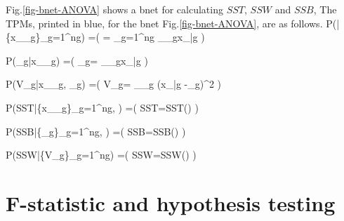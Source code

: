 Fig.\ref{fig-bnet-ANOVA}
shows a bnet for
calculating $SST$,
$SSW$ and $SSB$,
The TPMs, 
printed in blue,
for the bnet 
Fig.\ref{fig-bnet-ANOVA},
are as follows.
\beq\color{blue}
P(|\{x_{\Sigma_g}\}_{g=1}^{ng}) =\indi\left(
=
\sum_{g=1}^{ng}
\sum_{\s\in\Sigma_g}x_{\s|g}
\right)
\eeq


\beq\color{blue}
P(_g|x_{\Sigma_g}) =\indi\left(
_g=
\sum_{\s\in\Sigma_g}x_{\s|g}
\right)
\eeq

\beq\color{blue}
P(V_g|x_{\Sigma_g}, _g) =\indi\left(
V_g=
\sum_{\s\in\Sigma_g}
(x_{\s|g} -_g)^2
\right)
\eeq

\beq\color{blue}
P(SST|\{x_{\Sigma_g}\}_{g=1}^{ng},
) =\indi(
SST=SST()
)
\eeq

\beq\color{blue}
P(SSB|\{_g\}_{g=1}^{ng},
) =\indi(
SSB=SSB()
)
\eeq

\beq\color{blue}
P(SSW|\{V_g\}_{g=1}^{ng}) =\indi(
SSW=SSW()
)
\eeq

\section{F-statistic and hypothesis testing}
